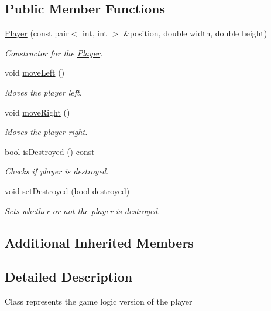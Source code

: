 \subsection*{Public Member Functions}
\begin{DoxyCompactItemize}
\item 
\hyperlink{classGameLogic_1_1Player_aeb3e4e8b10bf96de2543cafb683cf279}{Player} (const pair$<$ int, int $>$ \&position, double width, double height)
\begin{DoxyCompactList}\small\item\em Constructor for the \hyperlink{classGameLogic_1_1Player}{Player}. \end{DoxyCompactList}\item 
void \hyperlink{classGameLogic_1_1Player_a0595d93baa8c135aec8b9a6febc5d18c}{move\+Left} ()
\begin{DoxyCompactList}\small\item\em Moves the player left. \end{DoxyCompactList}\item 
void \hyperlink{classGameLogic_1_1Player_a42e5ab72dddca42e2ea2bbdeed63995e}{move\+Right} ()
\begin{DoxyCompactList}\small\item\em Moves the player right. \end{DoxyCompactList}\item 
bool \hyperlink{classGameLogic_1_1Player_a42d847fc003d1085a99aa0e72630aed2}{is\+Destroyed} () const
\begin{DoxyCompactList}\small\item\em Checks if player is destroyed. \end{DoxyCompactList}\item 
void \hyperlink{classGameLogic_1_1Player_a1f866a43d2db9e5f3dbeca80cbba28a7}{set\+Destroyed} (bool destroyed)
\begin{DoxyCompactList}\small\item\em Sets whether or not the player is destroyed. \end{DoxyCompactList}\end{DoxyCompactItemize}
\subsection*{Additional Inherited Members}


\subsection{Detailed Description}
Class represents the game logic version of the player 

